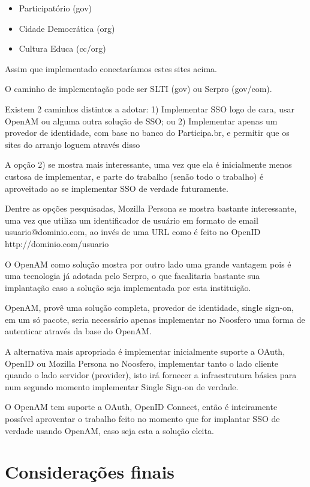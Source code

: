 \documentclass[11pt]{article}
\begin{document}
\begin{itemize}
  \item{Participatório (gov)}
  \item{Cidade Democrática (org)}
  \item{Cultura Educa (cc/org)}
\end{itemize}

Assim que implementado conectaríamos estes sites acima.

O caminho de implementação pode ser SLTI (gov) ou Serpro (gov/com).

Existem 2 caminhos distintos a adotar:
1) Implementar SSO logo de cara, usar OpenAM ou alguma outra solução de SSO; ou
2) Implementar apenas um provedor de identidade, com base no banco do
Participa.br, e permitir que os sites do arranjo loguem através disso

A opção 2) se mostra mais interessante, uma vez que ela é inicialmente menos
custosa de implementar, e parte do trabalho (senão todo o trabalho) é
aproveitado ao se implementar SSO de verdade futuramente.

Dentre as opções pesquisadas, Mozilla Persona se mostra bastante interessante,
uma vez que utiliza um identificador de usuário em formato de email
usuario@dominio.com, ao invés de uma URL como é feito no OpenID
http://dominio.com/usuario

O OpenAM como solução mostra por outro lado uma grande vantagem pois é uma
tecnologia já adotada pelo Serpro, o que facalitaria bastante sua implantação
caso a solução seja implementada por esta instituição.

OpenAM, provê uma solução completa, provedor de identidade, single sign-on, em
um só pacote, seria necessário apenas implementar no Noosfero uma forma de
autenticar através da base do OpenAM.

A alternativa mais apropriada é implementar inicialmente suporte a OAuth,
OpenID ou Mozilla Persona no Noosfero, implementar tanto o lado cliente quando
o lado servidor (provider), isto irá fornecer a infraestrutura básica para num
segundo momento implementar Single Sign-on de verdade.

O OpenAM tem suporte a OAuth, OpenID Connect, então é inteiramente possível
aproventar o trabalho feito no momento que for implantar SSO de verdade usando
OpenAM, caso seja esta a solução eleita.

\section{Considerações finais}
\end{document}
